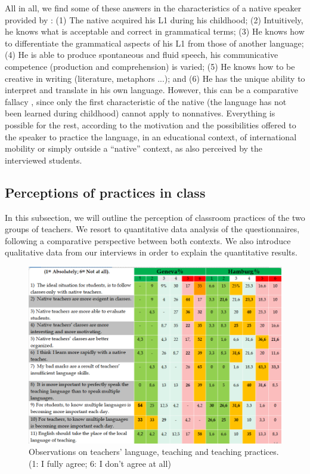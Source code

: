 \documentclass[output=paper]{../langscibook}
\begin{document}
All in all, we find some of these answers in the characteristics of a native speaker provided  by \citet[210--211]{Davies2003}: (1) The native acquired his L1 during his childhood; (2) Intuitively, he knows what is acceptable and correct in grammatical terms; (3) He knows how to differentiate the grammatical aspects of his L1 from those of another language; (4) He is able to produce spontaneous and fluid speech, his communicative competence (production and comprehension) is varied; (5)  He knows how to be creative in writing (literature, metaphors ...); and (6)  He has the unique ability to interpret and translate in his own language. However, this can be a comparative fallacy \citep{Bley-Vromon1983}, since only the first characteristic of the native (the language has not been learned during childhood) cannot apply to nonnatives. Everything is possible for the rest, according to the motivation and the possibilities offered to the speaker to practice the language, in an educational context, of international mobility or simply outside a “native” context, as also perceived by the interviewed students.

 \subsection{Perceptions of practices in class}


In this subsection, we will outline the perception of classroom practices of the two groups of teachers. We resort to quantitative data analysis of the questionnaires, following a comparative perspective between both contexts. We also introduce qualitative data from our interviews in order to explain the quantitative results.
  
\begin{figure}
\includegraphics[width=\textwidth]{figures/Chapter9-img001.png}
\caption{Observations on teachers’ language, teaching and teaching practices. (1: I fully agree; 6: I don’t agree at all)\label{fig:9:1}}
\end{figure}
\end{document}
